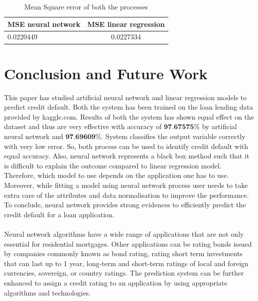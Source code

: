 \documentclass{article}[]
\begin{document}
\begin{table} 
\caption{Mean Square error of both the processes} %
\centering      %
\begin{tabular}{l|c}  %
\hline                      %
{\bf MSE neural network}&{\bf MSE linear regression}\\
\hline                    %
0.0220449 & 0.0227334\\
\hline     %
\end{tabular} 
\label{table:mse} 
\end{table}
\section{Conclusion and Future Work}
This paper has studied artificial neural network and linear regression models to predict credit default. Both the system has been trained on the loan lending data provided by kaggle.com. Results of both the system has shown equal effect on the dataset and thus are very effective with accuracy of $\textbf{97.67575\%}$ by artificial neural network and $\textbf{97.69609\%}$. System classifies the output variable correctly with very low error. So, both process can be used to identify credit default with equal accuracy. Also, neural network represents a black box method such that it is difficult to explain the outcome compared to linear regression model. Therefore, which model to use depends on the application one has to use. Moreover, while fitting a model using neural network process user needs to take extra care of the attributes and data normalisation to improve the performance. To conclude, neural network provides strong evidences to efficiently predict the credit default for a loan application.\\\\
Neural network algorithms have a wide range of applications that are not only essential for residential mortgages. Other applications can be rating bonds issued by companies commonly known as bond rating, rating short term investments that can last up to 1 year, long-term and short-term ratings of local and foreign currencies, sovereign, or country ratings. The prediction system can be further enhanced to assign a credit rating to an application by using appropriate algorithms and technologies.


 
\end{document}
